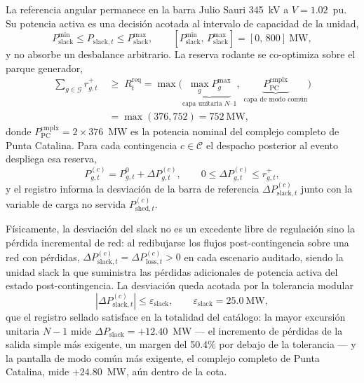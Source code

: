 La referencia angular permanece en la barra Julio Sauri 345~kV a $V=1.02$~pu. Su potencia activa es una decisión acotada al intervalo de capacidad de la unidad,
\begin{equation}
P_{\mathrm{slack}}^{\min} \le P_{\mathrm{slack},t} \le P_{\mathrm{slack}}^{\max}, \qquad [P_{\mathrm{slack}}^{\min},\, P_{\mathrm{slack}}^{\max}] = [0,\, 800]~\mathrm{MW},
\label{eq:slackbox}
\end{equation}
y no absorbe un desbalance arbitrario. La reserva rodante se co-optimiza sobre el parque generador,
\begin{equation}
\begin{aligned}
\sum_{g \in \mathcal{G}} r_{g,t}^{+} \;&\ge\; R_t^{\mathrm{req}}
= \max\bigl(\underbrace{\max_{g} P_g^{\max}}_{\text{capa unitaria $N$--$1$}},\;
\underbrace{P_{\mathrm{PC}}^{\mathrm{cmplx}}}_{\text{capa de modo com\'un}}\bigr)\\
&= \max(376, 752) = 752~\mathrm{MW},
\end{aligned}
\label{eq:reserve}
\end{equation}
donde $P_{\mathrm{PC}}^{\mathrm{cmplx}} = 2 \times 376$~MW es la potencia nominal del complejo completo de Punta Catalina. Para cada contingencia $c \in \mathcal{C}$ el despacho posterior al evento despliega esa reserva,
\begin{equation}
P_{g,t}^{(c)} = P_{g,t}^{0} + \Delta P_{g,t}^{(c)}, \qquad 0 \le \Delta P_{g,t}^{(c)} \le r_{g,t}^{+},
\label{eq:deploy}
\end{equation}
y el registro informa la desviación de la barra de referencia $\Delta P_{\mathrm{slack},t}^{(c)}$ junto con la variable de carga no servida $P_{\mathrm{shed},t}^{(c)}$.

Físicamente, la desviación del slack no es un excedente libre de regulación sino la pérdida incremental de red: al redibujarse los flujos post-contingencia sobre una red con pérdidas, $\Delta P_{\mathrm{slack},t}^{(c)} = \Delta P_{\mathrm{loss},t}^{(c)} > 0$ en cada escenario auditado, siendo la unidad slack la que suministra las pérdidas adicionales de potencia activa del estado post-contingencia. La desviación queda acotada por la tolerancia modular
\begin{equation}
|\Delta P_{\mathrm{slack},t}^{(c)}| \le \varepsilon_{\mathrm{slack}}, \qquad \varepsilon_{\mathrm{slack}} = 25.0~\mathrm{MW},
\label{eq:slacktol}
\end{equation}
que el registro sellado satisface en la totalidad del catálogo: la mayor excursión unitaria $N-1$ mide $\Delta P_{\mathrm{slack}} = +12.40$~MW --- el incremento de pérdidas de la salida simple más exigente, un margen del 50.4\% por debajo de la tolerancia --- y la pantalla de modo común más exigente, el complejo completo de Punta Catalina, mide $+24.80$~MW, aún dentro de la cota.

